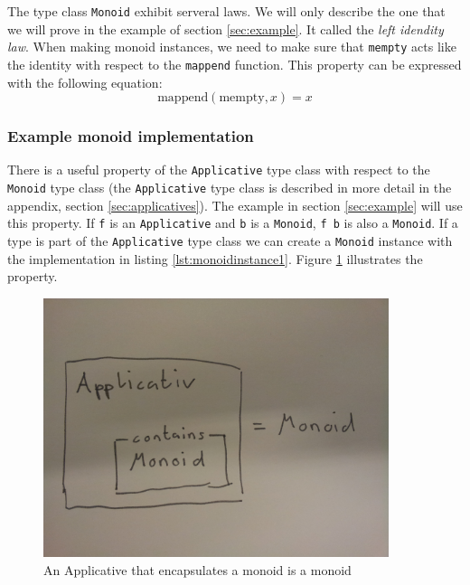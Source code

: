 The type class \verb|Monoid| exhibit serveral laws. We will only describe the one that we will prove in the example of section \ref{sec:example}. It called the \emph{left idendity law}.
When making monoid instances, we need to make sure that \verb|mempty| acts like the identity with respect to the \verb|mappend| function. This property can be expressed with the following equation:
\begin{equation}
  \label{eq:firstmonoidlaw}
  \text{mappend}(\text{mempty}, x) = x
\end{equation}

\subsubsection{Example monoid implementation}

There is a useful property of the \verb|Applicative| type class with respect to the \verb|Monoid| type class (the \verb|Applicative| type class is described in more detail in the appendix, section \ref{sec:applicatives}). The example in section \ref{sec:example} will use this property. If \verb|f| is an \verb|Applicative| and \verb|b| is a \verb|Monoid|, \verb|f b| is also a \verb|Monoid|. If a type is part of the \verb|Applicative| type class we can create a \verb|Monoid| instance with the implementation in listing \ref{lst:monoidinstance1}. Figure \ref{fig:applicative_monoid} illustrates the property.

\begin{figure}
  \centering
     \includegraphics[width=0.9\textwidth]{applicative_monoid}
  \caption{An Applicative that encapsulates a monoid is a monoid}
  \label{fig:applicative_monoid}
\end{figure}

